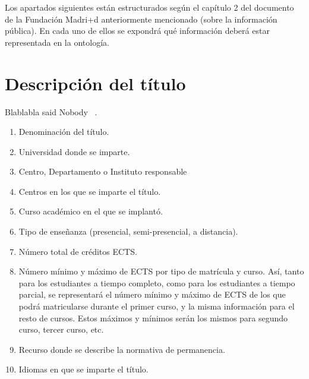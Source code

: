 Los apartados siguientes están estructurados según el capítulo 2 del documento de la Fundación Madri+d anteriormente mencionado (sobre la información pública). En cada uno de ellos se expondrá qué información deberá estar representada en la ontología.


\section{Descripción del título}

Blablabla said Nobody ~\cite{Nobody06}.

\begin{enumerate}

    \item Denominación del título.

    \item Universidad donde se imparte.

    \item Centro, Departamento o Instituto responsable

    \item Centros en los que se imparte el título.

    \item Curso académico en el que se implantó.

    \item Tipo de enseñanza (presencial, semi-presencial, a distancia).

    \item Número total de créditos ECTS.

    \item Número mínimo y máximo de ECTS por tipo de matrícula y curso. Así, tanto para
        los estudiantes a tiempo completo, como para los estudiantes a tiempo
        parcial, se representará el número mínimo y máximo de ECTS de los que
        podrá matricularse durante el primer curso, y la misma información para
        el resto de cursos. Estos máximos y mínimos serán los mismos para
        segundo curso, tercer curso, etc.

    \item Recurso donde se describe la normativa de permanencia.

    \item Idiomas en que se imparte el título.

\end{enumerate}

